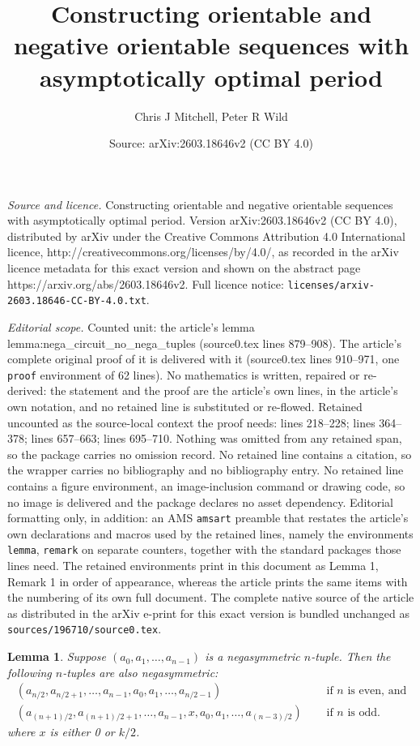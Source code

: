 \documentclass[10pt,a4paper]{amsart}
\title{Constructing orientable and negative orientable sequences with asymptotically optimal period}
\author{Chris J Mitchell, Peter R Wild}
\date{Source: arXiv:2603.18646v2 (CC BY 4.0)}
\newtheorem{lemma}{Lemma}
\begin{document}
\maketitle

\noindent\emph{Source and licence.} Constructing orientable and negative orientable sequences with asymptotically optimal period. Version arXiv:2603.18646v2 (CC BY 4.0), distributed by arXiv under the Creative Commons Attribution 4.0 International licence, http://creativecommons.org/licenses/by/4.0/, as recorded in the arXiv licence metadata for this exact version and shown on the abstract page https://arxiv.org/abs/2603.18646v2. Full licence notice: \texttt{licenses/arxiv-2603.18646-CC-BY-4.0.txt}.\par\smallskip

\noindent\textit{Editorial scope.} Counted unit: the article's lemma lemma:nega\_circuit\_no\_nega\_tuples (source0.tex lines 879--908). The article's complete original proof of it is delivered with it (source0.tex lines 910--971, one \texttt{proof} environment of 62 lines). No mathematics is written, repaired or re-derived: the statement and the proof are the article's own lines, in the article's own notation, and no retained line is substituted or re-flowed.  Retained uncounted as the source-local context the proof needs: lines 218--228; lines 364--378; lines 657--663; lines 695--710.  Nothing was omitted from any retained span, so the package carries no omission record.  No retained line contains a citation, so the wrapper carries no bibliography and no bibliography entry.  No retained line contains a figure environment, an image-inclusion command or drawing code, so no image is delivered and the package declares no asset dependency.  Editorial formatting only, in addition: an AMS \texttt{amsart} preamble that restates the article's own declarations and macros used by the retained lines, namely the environments \texttt{lemma}, \texttt{remark} on separate counters, together with the standard packages those lines need.  The retained environments print in this document as Lemma 1, Remark 1 in order of appearance, whereas the article prints the same items with the numbering of its own full document.  The complete native source of the article as distributed in the arXiv e-print for this exact version is bundled unchanged as \texttt{sources/196710/source0.tex}.
\begin{lemma}  \label{lemma:nega_moved_by_halfn_is_nega}
Suppose $(a_0,a_1,\dots,a_{n-1})$ is a negasymmetric $n$-tuple.  Then the following $n$-tuples are
also negasymmetric:
\[
\begin{split}
(a_{n/2},a_{n/2+1},\dots,a_{n-1},a_0,a_1,\dots,a_{n/2-1}) & \text{~~~~if $n$ is even, and} \\
(a_{(n+1)/2},a_{(n+1)/2+1},\dots,a_{n-1},x,a_0,a_1,\dots,a_{(n-3)/2}) & \text{~~~~if $n$ is odd.}
\end{split}
\]
where $x$ is either 0 or $k/2$.
\end{lemma}
\end{document}
